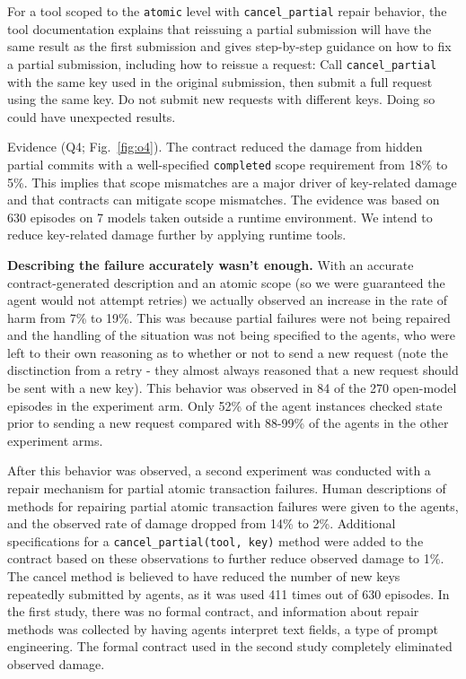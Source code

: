 \documentclass[letterpaper,twocolumn,10pt]{article}
\begin{document}
For a tool scoped to the \texttt{atomic} level with \texttt{cancel\_partial} repair behavior, the tool documentation explains that reissuing a partial submission will have the same result as the first submission and gives step-by-step guidance on how to fix a partial submission, including how to reissue a request: Call \texttt{cancel\_partial} with the same key used in the original submission, then submit a full request using the same key. Do not submit new requests with different keys. Doing so could have unexpected results.

Evidence (Q4; Fig.~\ref{fig:o4}). The contract reduced the damage from hidden partial commits with a well-specified \texttt{completed} scope requirement from 18\% to 5\%. This implies that scope mismatches are a major driver of key-related damage and that contracts can mitigate scope mismatches. The evidence was based on 630 episodes on 7 models taken outside a runtime environment. We intend to reduce key-related damage further by applying runtime tools.

\textbf{Describing the failure accurately wasn't enough.} With an accurate contract-generated description and an atomic scope (so we were guaranteed the agent would not attempt retries) we actually observed an increase in the rate of harm from 7\% to 19\%. This was because partial failures were not being repaired and the handling of the situation was not being specified to the agents, who were left to their own reasoning as to whether or not to send a new request (note the disctinction from a retry - they almost always reasoned that a new request should be sent with a new key). This behavior was observed in 84 of the 270 open-model episodes in the experiment arm. Only 52\% of the agent instances checked state prior to sending a new request compared with 88-99\% of the agents in the other experiment arms.

After this behavior was observed, a second experiment was conducted with a repair mechanism for partial atomic transaction failures. Human descriptions of methods for repairing partial atomic transaction failures were given to the agents, and the observed rate of damage dropped from 14\% to 2\%. Additional specifications for a \texttt{cancel\_partial(tool, key)} method were added to the contract based on these observations to further reduce observed damage to 1\%. The cancel method is believed to have reduced the number of new keys repeatedly submitted by agents, as it was used 411 times out of 630 episodes. In the first study, there was no formal contract, and information about repair methods was collected by having agents interpret text fields, a type of prompt engineering. The formal contract used in the second study completely eliminated observed damage.
\end{document}
